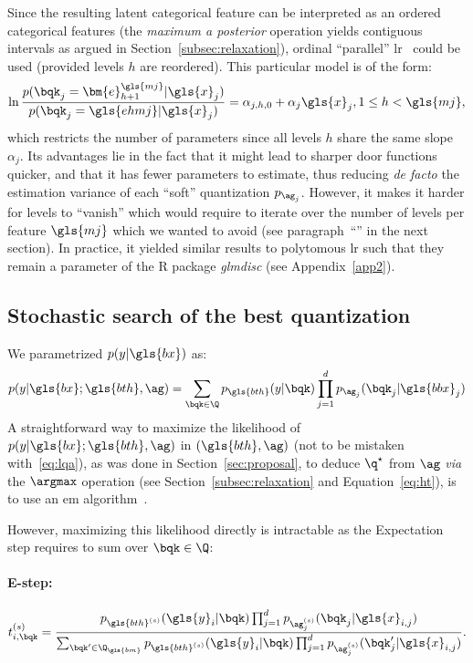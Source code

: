 Since the resulting latent categorical feature can be interpreted as an ordered categorical features (the \textit{maximum a posterior} operation yields contiguous intervals as argued in Section~\ref{subsec:relaxation}), ordinal ``parallel'' \gls{lr}~\cite{o2006logistic} could be used (provided levels $h$ are reordered). This particular model is of the form:
\[ \ln \frac{p(\bqk_{j} = \bm{e}_{h+1}^{\gls{mj}} | \gls{x}_j)}{p(\bqk_{j} = \gls{ehmj} | \gls{x}_j)} = \alpha_{j,h,0} + \alpha_{j} \gls{x}_j, 1 \leq h < \gls{mj}, \]
which restricts the number of parameters since all levels $h$ share the same slope $\alpha_j$. Its advantages lie in the fact that it might lead to sharper door functions quicker, and that it has fewer parameters to estimate, thus reducing \textit{de facto} the estimation variance of each ``soft'' quantization $p_{\ag_j}$. However, it makes it harder for levels to ``vanish'' which would require to iterate over the number of levels per feature $\gls{mj}$ which we wanted to avoid (see paragraph~``'' in the next section). In practice, it yielded similar results to polytomous \gls{lr} such that they remain a parameter of the \textsf{R} package \textit{glmdisc} (see Appendix~\ref{app2}).

\subsection{Stochastic search of the best quantization} \label{subsec:stoch}

We parametrized $p(y|\gls{bx})$ as:
\begin{equation}
p(y | \gls{bx}; \gls{bth}, \ag) = \sum_{\bqk \in \Q} p_{\gls{bth}}(y | \bqk) \prod_{j=1}^d p_{\ag_j}(\bqk_j | \gls{bbx}_j)
\end{equation}
A straightforward way to maximize the likelihood of $p(y | \gls{bx}; \gls{bth}, \ag)$ in $(\gls{bth}, \ag)$ (not to be mistaken with~\eqref{eq:lqa}), as was done in Section~\ref{sec:proposal}, to deduce $\q^\star$ from $\ag$ \textit{via} the $\argmax$ operation (see Section~\ref{subsec:relaxation} and Equation~\eqref{eq:ht}), is to use an \gls{em} algorithm~\cite{dempster1977maximum}.

However, maximizing this likelihood directly is intractable as the Expectation step requires to sum over $\bqk \in \Q$:

\paragraph{E-step:}
\[ t_{i,\bqk}^{(s)} = \frac{p_{\gls{bth}^{(s)}}(\gls{y}_i | \bqk) \prod_{j=1}^d p_{\ag_j^{(s)}}(\bqk_j | \gls{x}_{i,j})}{\sum_{\bqk ' \in \Q_{\gls{bm}}} p_{\gls{bth}^{(s)}}(\gls{y}_i | \bqk) \prod_{j=1}^d p_{\ag_j^{(s)}}(\bqk_j'  | \gls{x}_{i,j})}. \]

